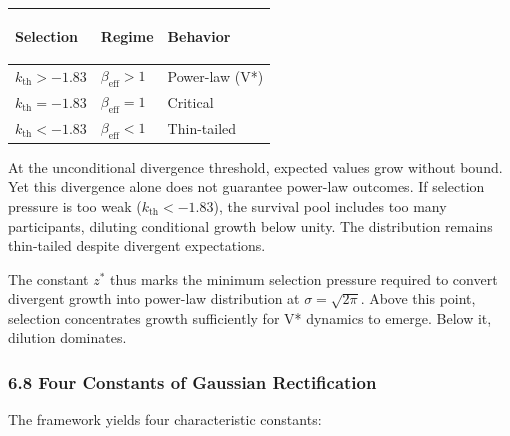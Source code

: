 \documentclass[
  11pt,
  openany]{article}
\newcounter{none} %
\begin{document}
{\def\LTcaptype{none} %
\begin{longtable}[]{@{}
  >{\raggedright\arraybackslash}p{}
  >{\raggedright\arraybackslash}p{}
  >{\raggedright\arraybackslash}p{}@{}}
\toprule\noalign{}
{\bfseries 

Selection

} & {\bfseries 

Regime

} & {\bfseries 

Behavior

} \\
\midrule\noalign{}
\endhead
\bottomrule\noalign{}
\endlastfoot
\(k_{\text{th}} > -1.83\) & \(\beta_{\text{eff}} > 1\) & Power-law
(V*) \\
\(k_{\text{th}} = -1.83\) & \(\beta_{\text{eff}} = 1\) & Critical \\
\(k_{\text{th}} < -1.83\) & \(\beta_{\text{eff}} < 1\) & Thin-tailed \\
\end{longtable}
}

At the unconditional divergence threshold, expected values grow without
bound. Yet this divergence alone does not guarantee power-law outcomes.
If selection pressure is too weak (\(k_{\text{th}} < -1.83\)), the
survival pool includes too many participants, diluting conditional
growth below unity. The distribution remains thin-tailed despite
divergent expectations.

The constant \(z^*\) thus marks the minimum selection pressure required
to convert divergent growth into power-law distribution at
\(\sigma = \sqrt{2\pi}\). Above this point, selection concentrates
growth sufficiently for V* dynamics to emerge. Below it, dilution
dominates.

\subsubsection{6.8 Four Constants of Gaussian
Rectification}\label{four-constants-of-gaussian-rectification}

The framework yields four characteristic constants:
\end{document}
